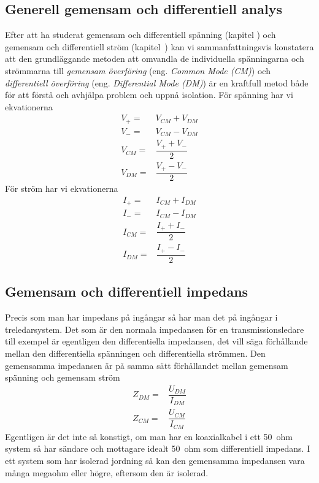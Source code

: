 \subsection{Generell gemensam och differentiell analys}
\label{comdiffgeneric}

Efter att ha studerat gemensam och differentiell spänning (kapitel
) och gemensam och differentiell ström (kapitel~)
kan vi sammanfattningsvis konstatera att den grundläggande metoden att omvandla
de individuella spänningarna och strömmarna till \emph{gemensam överföring}
(eng. \emph{Common Mode (CM)}) och \emph{differentiell överföring}
(eng. \emph{Differential Mode (DM)}) är en kraftfull metod både för att
förstå och avhjälpa problem och uppnå isolation.
För spänning har vi ekvationerna
\begin{eqnarray*}
V_+ = & V_{CM} + V_{DM}\\
V_- = & V_{CM} - V_{DM}\\
V_{CM} = & \dfrac{V_+ + V_-}{2}\\
V_{DM} = & \dfrac{V_+ - V_-}{2}
\end{eqnarray*}
För ström har vi ekvationerna
\begin{eqnarray*}
I_+ = & I_{CM} + I_{DM}\\
I_- = & I_{CM} - I_{DM}\\
I_{CM} = & \dfrac{I_+ + I_-}{2}\\
I_{DM} = & \dfrac{I_+ - I_-}{2}
\end{eqnarray*}

\subsection{Gemensam och differentiell impedans}

Precis som man har impedans på ingångar så har man det på ingångar i
treledarsystem.
Det som är den normala impedansen för en transmissionsledare till exempel är
egentligen den differentiella impedansen, det vill säga förhållande mellan den
differentiella spänningen och differentiella strömmen.
Den gemensamma impedansen är på samma sätt förhållandet mellan gemensam
spänning och gemensam ström
\begin{eqnarray*}
Z_{DM} = & \dfrac{U_{DM}}{I_{DM}}\\
Z_{CM} = & \dfrac{U_{CM}}{I_{CM}}
\end{eqnarray*}
Egentligen är det inte så konstigt, om man har en koaxialkabel i ett 50~ohm
system så har sändare och mottagare idealt 50~ohm som differentiell impedans.
I ett system som har isolerad jordning så kan den gemensamma impedansen vara
många megaohm eller högre, eftersom den är isolerad.

